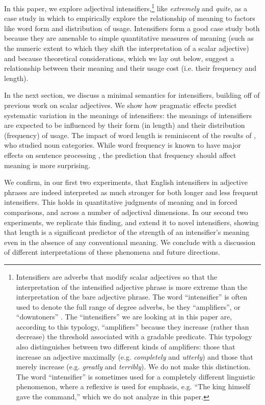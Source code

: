 \documentclass[10pt,letterpaper]{article}
\newcommand{\w}[1]{\emph{#1}}
\begin{document}
In this paper, we explore adjectival intensifiers,\footnote{
  Intensifiers are adverbs that modify scalar adjectives so that the interpretation of the intensified adjective phrase is more extreme than the interpretation of the bare adjective phrase. The word ``intensifier'' is often used to denote the full range of degree adverbs, be they ``amplifiers'', or ``downtoners'' \cite{quirk}. The ``intensifiers'' we are looking at in this paper are, according to this typology, ``amplifiers'' because they increase (rather than decrease) the threshold associated with a gradable predicate. This typology also distinguishes between two different kinds of amplifiers: those that increase an adjective maximally (e.g. \w{completely} and \w{utterly}) and those that merely increase (e.g. \w{greatly} and \w{terribly}). We do not make this distinction. The word ``intensifier'' is sometimes used for a completely different linguistic phenomenon, where a reflexive is used for emphasis, e.g. ``The king himself gave the command,'' which we do not analyze in this paper.
 }
like \w{extremely} and \w{quite},
as a case study in which to empirically explore the relationship of meaning to factors like word form and distribution of usage.
Intensifiers form a good case study both because they are amenable to simple quantitative measures of meaning (such as the numeric extent to which they shift the interpretation of a scalar adjective) and because theoretical considerations, which we lay out below, suggest a relationship between their meaning and their usage cost (i.e. their frequency and length).

In the next section, we discuss a minimal semantics for intensifiers, building off of previous work on scalar adjectives. We show how pragmatic effects predict systematic variation in the meanings of intensifiers: the meanings of intensifiers are expected to be influenced by their form (in length) and their distribution (frequency) of usage. The impact of word length is reminiscent of the results of , who studied noun categories. While word frequency is known to have major effects on sentence processing \cite[e.g.]{levy}, the prediction that frequency should affect meaning is more surprising.

We confirm, in our first two experiments, that English intensifiers in adjective phrases are indeed interpreted as much stronger for both longer and less frequent intensifiers. This holds in quantitative judgments of meaning and in forced comparisons, and across a number of adjectival dimensions. In our second two experiments, we replicate this finding, and extend it to novel intensifiers, showing that length is a significant predictor of the strength of an intensifier's meaning even in the absence of any conventional meaning. We conclude with a discussion of different interpretations of these phenomena and future directions.
\end{document}
